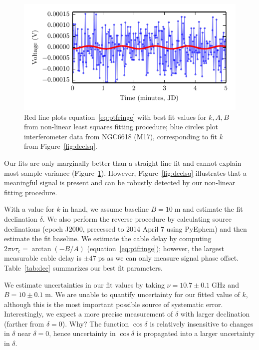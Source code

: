 \documentclass[10pt]{article}
\newcommand {\mt}{\mathrm}
\newcommand {\unit}[1]{\; \mt{#1}}
\begin{document}
\begin{figure}[!ht]
    \centering
    \includegraphics{plots_fitting/M17_dec_fits_signal.pdf}
    \caption{Red line plots equation~\ref{eq:ptfringe} with best fit values for $k,A,B$ from non-linear least squares fitting procedure; blue circles plot interferometer data from NGC6618 (M17), corresponding to fit $k$ from Figure~\ref{fig:declsq}.}
    \label{fig:decsig}
\end{figure}

Our fits are only marginally better than a straight line fit and cannot explain most sample variance (Figure~\ref{fig:decsig}).  However, Figure~\ref{fig:declsq} illustrates that a meaningful signal is present and can be robustly detected by our non-linear fitting procedure.

With a value for $k$ in hand, we assume baseline $B = 10 \unit{m}$ and estimate the fit declination $\delta$.  We also perform the reverse procedure by calculating source declinations (epoch J2000, precessed to 2014 April 7 using PyEphem) and then estimate the fit baseline.  We estimate the cable delay by computing $2\pi\nu\tau_c = \arctan(-B/A)$ (equation~\ref{eq:ptfringe}); however, the largest measurable cable delay is $\pm 47 \unit{ps}$ as we can only measure signal phase offset.  Table~\ref{tab:dec} summarizes our best fit parameters.

We estimate uncertainties in our fit values by taking $\nu = 10.7 \pm 0.1 \unit{GHz}$ and $B = 10 \pm 0.1 \unit{m}$.  We are unable to quantify uncertainty for our fitted value of $k$, although this is the most important possible source of systematic error.  Interestingly, we expect a more precise measurement of $\delta$ with larger declination (farther from $\delta=0$).  Why?  The function $\cos\delta$ is relatively insensitive to changes in $\delta$ near $\delta=0$, hence uncertainty in $\cos\delta$ is propagated into a larger uncertainty in $\delta$.
\end{document}
